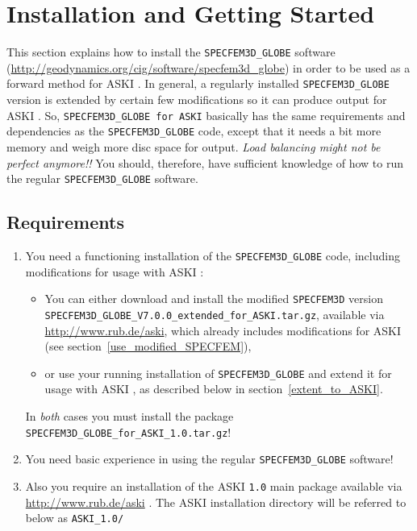 \documentclass[12pt,a4paper]{article}
\newcommand{\lcode}[1]{\nolinkurl{#1}}
\newcommand{\ASKI}{ {\ttfamily ASKI} }
\begin{document}
\section{Installation and Getting Started} \label{install}
%
This section explains how to install the \lcode{SPECFEM3D_GLOBE} software 
(\url{http://geodynamics.org/cig/software/specfem3d_globe})
in order to be used as a forward method for \ASKI. 
In general, a regularly installed \lcode{SPECFEM3D_GLOBE} version is extended by certain few modifications 
so it can produce output for \ASKI. So, \lcode{SPECFEM3D_GLOBE for ASKI} basically has the same requirements 
and dependencies as the \lcode{SPECFEM3D_GLOBE} code, except that it needs a bit more memory and weigh more 
disc space for output. \emph{Load balancing might not be perfect anymore!!} You should, therefore, have sufficient 
knowledge of how to run the regular \lcode{SPECFEM3D_GLOBE} software. 

\subsection{Requirements} %
\begin{enumerate}
\item You need a functioning installation of the \lcode{SPECFEM3D_GLOBE} code, including 
   modifications for usage with \ASKI:
   \begin{itemize}
   \item You can either download and install the modified \lcode{SPECFEM3D} version \\
   \lcode{SPECFEM3D_GLOBE_V7.0.0_extended_for_ASKI.tar.gz}, available via 
   \url{http://www.rub.de/aski}, which already includes modifications for \ASKI (see section~\ref{use_modified_SPECFEM}{}),
 \item or use your running installation of \lcode{SPECFEM3D_GLOBE} and extend it for usage 
   with \ASKI, as described below in section~\ref{extent_to_ASKI}{}.
   \end{itemize}
   In \emph{both} cases you must install the package \lcode{SPECFEM3D_GLOBE_for_ASKI_1.0.tar.gz}!

 \item You need basic experience in using the regular \lcode{SPECFEM3D_GLOBE} software!
 \item Also you require an installation of the \ASKI \lcode{1.0} main package available via 
   \url{http://www.rub.de/aski} . The \ASKI installation directory will be referred to 
   below as \lcode{ASKI_1.0/}
\end{enumerate}
\end{document}
